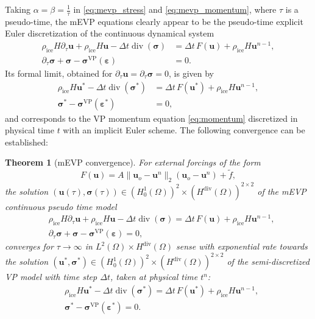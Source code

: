 \documentclass[11pt]{article}
\newtheorem{theorem}{Theorem}[section]
\newcommand{\bu}{\mathbf{u}}
\newcommand{\sig}{\boldsymbol{\sigma}}
\newcommand{\beps}{\boldsymbol{\varepsilon}}
\begin{document}
Taking $\alpha = \beta = \frac{1}{\tau}$ in \eqref{eq:mevp_stress} and \eqref{eq:mevp_momentum}, where $\tau$ is a pseudo-time, the mEVP equations  
clearly appear to be the pseudo-time explicit Euler discretization of the continuous dynamical system 
\begin{equation*}
\begin{aligned}
\rho_\text{ice} H \partial_\tau \bu+ \rho_\text{ice} H\bu-\Delta t \operatorname{div}(\sig)&=\Delta t\, F(\bu) + \rho_\text{ice} H\bu^{n-1}, \\
\partial_\tau \sig+\sig-\sig^{\mathrm{VP}}(\beps)&=0.
\end{aligned}
\end{equation*}Its formal limit, obtained for $\partial_\tau \bu = \partial_\tau \sig = 0$, is given by
\begin{equation*}
\begin{aligned}
\rho_\text{ice} H \bu^* -\Delta t \operatorname{div}(\sig^*)&=\Delta t\, F(\bu^*) + \rho_\text{ice} H\bu^{n-1}, \\
\sig^*-\sig^{\mathrm{VP}}(\beps^*)&=0,
\end{aligned}
\end{equation*} and corresponds to the VP momentum equation \eqref{eq:momentum} discretized in physical time $t$ with an implicit Euler scheme. 
The following convergence can be established:
\begin{theorem}[mEVP convergence]
\label{thm:VP cv}For external forcings of the form 
\[
F(\bu) = A \|\bu_o-\bu^n\|_2(\bu_o-\bu^n) + \tilde{f},
\]
the solution $(\bu(\tau), \sig(\tau)) \in (H^1_0(\Omega))^2 \times (H^{\operatorname{div}}(\Omega))^{2\times2}$ of the mEVP continuous pseudo time model
\begin{equation}
\begin{aligned}
&\rho_\text{ice} H \partial_\tau \bu+ \rho_\text{ice} H\bu-\Delta t \operatorname{div}(\sig)=\Delta t\, F(\bu) + \rho_\text{ice} H\bu^{n-1}, \\
&\partial_\tau \sig+\sig-\sig^{\mathrm{VP}}(\beps)=0,
\end{aligned}
\label{continuous-mEVP complete}
\end{equation}
converges for $\tau \rightarrow \infty$ in $L^2(\Omega) \times H^{\operatorname{div}}(\Omega)$ sense with exponential rate towards the solution $(\bu^*, \sig^*) \in (H^1_0(\Omega))^2 \times (H^{\operatorname{div}}(\Omega))^{2\times2}$ of the semi-discretized VP model with  time step $\Delta t$, taken at physical time $t^n$:
\begin{equation}
\begin{aligned}
&\rho_\text{ice} H \bu^* -\Delta t \operatorname{div}(\sig^*)=\Delta t\, F(\bu^*) + \rho_\text{ice} H\bu^{n-1}, \\
&\sig^*-\sig^{\mathrm{VP}}(\beps^*)=0.
\end{aligned}
\label{semi-discrete VP limit}
\end{equation} 
\end{theorem}
\end{document}
